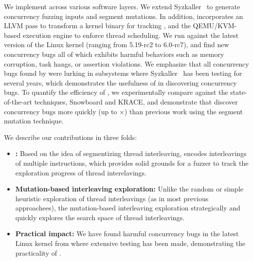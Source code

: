 

We implement \sys across various software layers.
We extend Syzkaller~\cite{syzkaller} to generate concurrency fuzzing inputs 
and segment mutations. 
%
In addition, \sys incorporates an LLVM pass to transform a kernel
binary for tracking \intcov, and the QEMU/KVM-based execution engine
to enforce thread scheduling.
%
We run \sys against the latest version of the Linux kernel (ranging
from 5.19-rc2 to 6.0-rc7), and find new \totalbugs concurrency bugs all of
which exhibits harmful behaviors such as memory corruption,
task hangs, or assertion violations. We emphasize that all
concurrency bugs found by \sys were lurking in subsystems where
Syzkaller~\cite{syzkaller} has been testing for several years, which
demonstrates the usefulness of \sys in discovering concurrency bugs.
%
To quantify the efficiency of \sys, we experimentally compare \sys 
against the state-of-the-art techniques, Snowboard and KRACE, and 
demonstrate that \sys discover concurrency bugs more quickly 
(up to $\times$) than previous work using the segment mutation 
technique.

We describe our contributions in three folds:

\begin{itemize}
\item \textbf{\Intcov:}
  Based on the idea of segmentizing thread interleaving, \intcov
  encodes interleavings of multiple instructions, which provides solid
  grounds for a fuzzer to track the exploration progress of thread
  interelavings.
\item \textbf{Mutation-based interleaving exploration:}
  Unlike the random or simple heuristic exploration of thread
  interleavings (as in most previous approachees), the mutation-based
  interleaving exploration strategically and quickly explores the
  search space of thread interleavings.
\item \textbf{Practical impact:}
  We have found \totalbugs harmful concurrency bugs in the latest
  Linux kernel from where extensive testing has been made,
  demonstrating the practicality of \sys.
\end{itemize}

